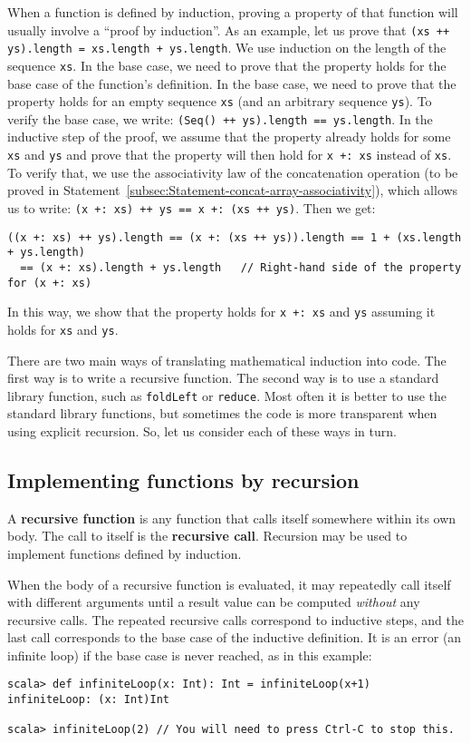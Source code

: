 When a function is defined by induction, proving a property of that
function will usually involve a \textsf{``}proof by induction\textsf{''}.
As an example, let us prove that \lstinline!(xs ++ ys).length = xs.length + ys.length!.
We use induction on the length of the sequence \lstinline!xs!. In
the base case, we need to prove that the property holds for the base
case of the function\textsf{'}s definition. In the base case, we need to prove
that the property holds for an empty sequence \lstinline!xs! (and
an arbitrary sequence \lstinline!ys!). To verify the base case, we
write: \lstinline!(Seq() ++ ys).length == ys.length!. In the inductive
step of the proof, we assume that the property already holds for some
\lstinline!xs! and \lstinline!ys! and prove that the property will
then hold for \lstinline!x +: xs! instead of \lstinline!xs!. To
verify that, we use the associativity law of the concatenation operation
(to be proved in Statement~\ref{subsec:Statement-concat-array-associativity}),
which allows us to write: \lstinline!(x +: xs) ++ ys == x +: (xs ++ ys)!.
Then we get:
\begin{lstlisting}
((x +: xs) ++ ys).length == (x +: (xs ++ ys)).length == 1 + (xs.length + ys.length)
  == (x +: xs).length + ys.length   // Right-hand side of the property for (x +: xs)
\end{lstlisting}
In this way, we show that the property holds for \lstinline!x +: xs!
and \lstinline!ys! assuming it holds for \lstinline!xs! and \lstinline!ys!.

There are two main ways of translating mathematical induction into
code. The first way is to write a recursive function. The second way
is to use a standard library function, such as \lstinline!foldLeft!
or \lstinline!reduce!. Most often it is better to use the standard
library functions, but sometimes the code is more transparent when
using explicit recursion. So, let us consider each of these ways in
turn.

\subsection{Implementing functions by recursion}

A \textbf{recursive function} is any function
that calls itself somewhere within its own body. The call to itself
is the \textbf{recursive call}. Recursion may be used to implement
functions defined by induction.

When the body of a recursive function is evaluated, it may repeatedly
call itself with different arguments until a result value can be computed
\emph{without} any recursive calls. The repeated recursive calls correspond
to inductive steps, and the last call corresponds to the base case
of the inductive definition. It is an error (an infinite loop) if
the base case is never reached, as in this example:
\begin{lstlisting}
scala> def infiniteLoop(x: Int): Int = infiniteLoop(x+1)
infiniteLoop: (x: Int)Int

scala> infiniteLoop(2) // You will need to press Ctrl-C to stop this.
\end{lstlisting}

